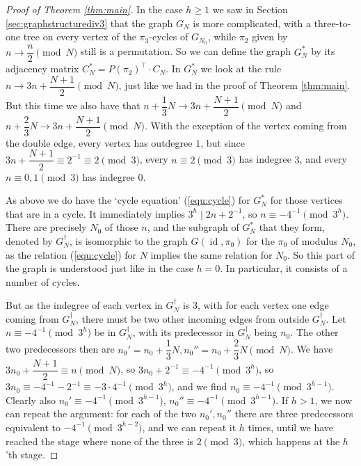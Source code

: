 \documentclass[10pt]{article}
\theoremstyle{definition}
\DeclareMathOperator{\id}{id}
\begin{document}
\begin{proof}[Proof of Theorem \ref{thm:main}]
    In the case $ h \geq 1 $ we saw in Section \ref{sec:graphstructurediv3} that the graph $ G_N $ is more
    complicated, with a three-to-one tree on every vertex of the $ \pi_3 $-cycles of $ G_{N_0} $, while
    $ \pi_2 $ given by $ n \to \dfrac{n}{2} \pmod{N} $ still is a permutation. So we can define the graph
    $ G_N^{\ast} $ by its adjacency matrix $ C_N^{\ast} = P\left(\pi_2\right)^{\top} \cdot C_N $. In
    $ G_N^{\ast} $ we look at the rule $ n \to 3n + \dfrac{N+1}{2} \pmod{N} $, just like we had in the proof
    of Theorem \ref{thm:main}. But this time we also have that
    $ n + \dfrac{1}{3}N \to 3n + \dfrac{N+1}{2} \pmod{N} $ and
    $ n + \dfrac{2}{3}N \to 3n + \dfrac{N+1}{2} \pmod{N} $. With the exception of the vertex coming from the
    double edge, every vertex has outdegree $ 1 $, but since
    $ 3n + \dfrac{N+1}{2} \equiv 2^{-1} \equiv 2 \pmod{3} $, every $ n \equiv 2 \pmod{3} $ has indegree
    $ 3 $, and every $ n \equiv 0, 1 \pmod{3} $ has indegree $ 0 $.

    As above we do have the `cycle equation' (\ref{equ:cycle}) for $ G_N^{\ast} $ for those vertices that are
    in a cycle. It immediately implies $ 3^h \mid 2n + 2^{-1} $, so $ n \equiv -4^{-1} \pmod{3^h} $. There
    are precisely $ N_0 $ of those $ n $, and the subgraph of $ G_N^{\ast} $ that they form, denoted by
    $ G_N^{\dagger} $, is isomorphic to the graph $ G(\id,\pi_0) $ for the $ \pi_0 $ of modulus $ N_0 $, as
    the relation (\ref{equ:cycle}) for $ N $ implies the same relation for $ N_0 $. So this part of the graph
    is understood just like in the case $ h = 0 $. In particular, it consists of a number of cycles.

    But as the indegree of each vertex in $ G_N^{\dagger} $ is $ 3 $, with for each vertex one edge coming
    from $ G_N^{\dagger} $, there must be two other incoming edges from outside $ G_N^{\dagger} $. Let
    $ n \equiv -4^{-1} \pmod{3^h} $ be in $ G_N^{\dagger} $, with its predecessor in $ G_N^{\dagger} $ being
    $ n_0 $. The other two predecessors then are
    $ n_0' = n_0 + \dfrac{1}{3} N, n_0'' = n_0 + \dfrac{2}{3} N \pmod{N} $. We have
    $ 3 n_0 + \dfrac{N+1}{2} \equiv n \pmod{N} $, so $ 3 n_0 + 2^{-1} \equiv -4^{-1} \pmod{3^h} $, so
    $ 3 n_0 \equiv -4^{-1} - 2^{-1} \equiv -3 \cdot 4^{-1} \pmod{3^h} $, and we find
    $ n_0 \equiv -4^{-1} \pmod{3^{h-1}} $. Clearly also
    $ n_0' \equiv -4^{-1} \pmod{3^{h-1}} $, $ n_0'' \equiv -4^{-1} \pmod{3^{h-1}} $. If $ h > 1 $, we now can
    repeat the argument: for each of the two $ n_0', n_0'' $ there are three predecessors equivalent to
    $ -4^{-1} \pmod{3^{h-2}} $, and we can repeat it $ h $ times, until we have reached the stage where none
    of the three is $ 2 \pmod{3} $, which happens at the $ h $'th stage.


\end{proof}
\end{document}
